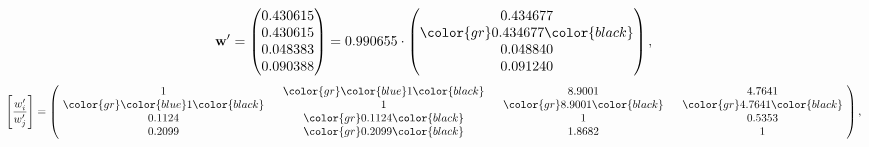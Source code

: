 \begin{example}
\begin{equation*}
\mathbf{w}^{\prime} =
\begin{pmatrix}
0.430615\\
0.430615\\
0.048383\\
0.090388
\end{pmatrix} =
0.990655\cdot
\begin{pmatrix}
0.434677\\
\color{gr} 0.434677\color{black} \\
0.048840\\
0.091240
\end{pmatrix},
\end{equation*}
\begin{equation*}
\left[ \frac{{w}^{\prime}_i}{{w}^{\prime}_j} \right] =
\begin{pmatrix}
$\,\,$ 1 $\,\,$ & $\,\,$\color{gr} \color{blue} 1\color{black} $\,\,$ & $\,\,$8.9001$\,\,$ & $\,\,$4.7641$\,\,$ \\
$\,\,$\color{gr} \color{blue} 1\color{black} $\,\,$ & $\,\,$ 1 $\,\,$ & $\,\,$\color{gr} 8.9001\color{black} $\,\,$ & $\,\,$\color{gr} 4.7641\color{black}   $\,\,$ \\
$\,\,$0.1124$\,\,$ & $\,\,$\color{gr} 0.1124\color{black} $\,\,$ & $\,\,$ 1 $\,\,$ & $\,\,$0.5353 $\,\,$ \\
$\,\,$0.2099$\,\,$ & $\,\,$\color{gr} 0.2099\color{black} $\,\,$ & $\,\,$1.8682$\,\,$ & $\,\,$ 1  $\,\,$ \\
\end{pmatrix},
\end{equation*}
\end{example}
\newpage
